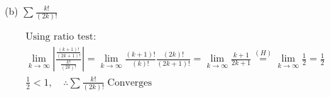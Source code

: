 \begin{itemize}
\begin{itemize}
                \item [(b)] $\sum\frac{k!}{(2k)!}$
                \\
                \begin{mdframed}
                    \begin{equation*}
                        \begin{gathered}
                            \text{Using ratio test:}    \\
                            \lim_{k \to \infty}\left|
                            \frac{\frac{(k+1)!}{(2k+1)!}}
                                 {\frac{k!}{(2k)!}}
                            \right| =
                            \lim_{k \to \infty}
                            \frac{(k+1)!}{(k)!}
                            \frac{(2k)!}{(2k+1)!} =
                            \lim_{k \to \infty}
                            \frac{k+1}{2k+1} \stackrel{(H)}{=}
                            \lim_{k \to \infty}
                            \frac{1}{2} =                 
                            \frac{1}{2}                 \\
                            \frac{1}{2} < 1, \quad \therefore \sum\frac{k!}{(2k)!} \; \boxed{\text{Converges}}
                        \end{gathered}
                    \end{equation*}
                \end{mdframed}
            \end{itemize}


\end{itemize}
